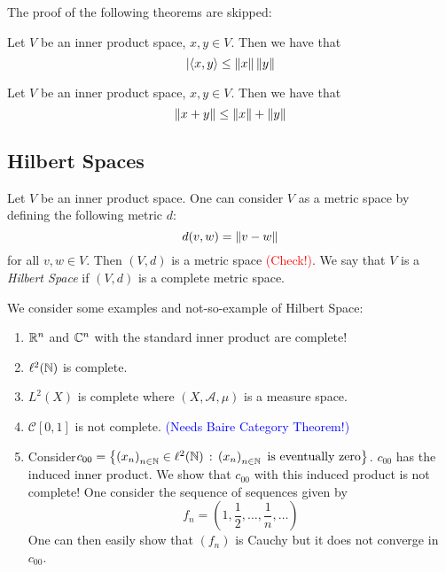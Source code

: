 The proof of the following theorems are skipped:
\begin{theorem}
    Let $V$ be an inner product space, $x,y \in V$. Then we have that 
    \begin{equation*}
	\lvert \left\langle x,y \right\rangle \le \left\lVert x \right\rVert\left\lVert y \right\rVert
    \end{equation*}
    \label{thm:CS-inequality}
\end{theorem}

\begin{theorem}
    Let $V$ be an inner product space, $x,y \in V$. Then we have that 
    \begin{equation*}
	\left\lVert x+y \right\rVert \le \left\lVert x \right\rVert + \left\lVert y \right\rVert
    \end{equation*}
    \label{thm:triangle-inequality}
\end{theorem}

\subsection{Hilbert Spaces}
\begin{definition}
    Let $V$ be an inner product space. One can consider $V$ as a metric space by defining the following metric $d$:
    \begin{equation*}
	d(v,w) = \left\lVert v-w \right\rVert
    \end{equation*}
    for all $v,w \in V$. Then $(V,d)$ is a metric space \textcolor{red}{(Check!)}. We say that $V$ is a \textit{Hilbert Space} if $(V,d)$ is a complete metric space.
    \label{def:Hilbert-Space}
\end{definition}

\begin{example} We consider some examples and not-so-example of Hilbert Space:
\begin{enumerate}
    \item $\mathbb R ^{n}$ and $\mathbb C ^{n}$ with the standard inner product are complete!
    \item $\ell ^{2} (\mathbb N )$ is complete.
    \item $L^2(X)$ is complete where $(X, \mathscr A , \mu)$ is a measure space.
    \item $\mathcal {C} [0,1]$ is not complete. \textcolor{blue}{(Needs Baire Category Theorem!)}
    \item Consider$c_{00} = \left\{ \left( x_{n} \right)_{n\in \mathbb N} \in \ell ^{2} (\mathbb N) \, : \, \left( x_{n} \right) _{n \in \mathbb N} \text{ is eventually zero} \right\}$. $c_{00}$ has the induced inner product. We show that $c_{00}$ with this induced product is not complete!
	One consider the sequence of sequences given by
	\begin{equation*}
	    f_{n} = \left( 1, \frac{1}{2} , \ldots , \frac{1}{n} , \ldots \right)
	\end{equation*}
	One can then easily show that $\left( f_n \right)$ is Cauchy but it does not converge in $c_{00}$.
\end{enumerate}
\end{example}
